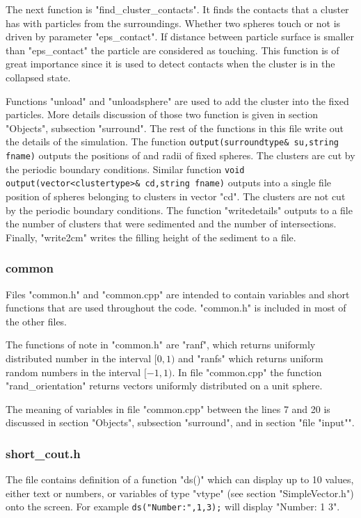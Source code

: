 \documentclass[12pt]{article}
\begin{document}
The next function is "find\_cluster\_contacts". It finds the contacts that a cluster has with particles from the surroundings. Whether two spheres touch or not is driven by parameter "eps\_contact". If distance between particle surface is smaller than "eps\_contact" the particle are considered as touching. This function is of great importance since it is used to detect contacts when the cluster is in the collapsed state. 

Functions "unload" and "unloadsphere" are used to add the cluster into the fixed particles. More details discussion of those two function is given in section "Objects", subsection "surround". The rest of the functions in this file write out the details of the simulation. The function \texttt{output(surroundtype\& su,string fname)} outputs the positions of and radii of fixed spheres. The clusters are cut by the periodic boundary conditions. Similar function \texttt{void output(vector<clustertype>\& cd,string fname)} outputs into a single file position of spheres belonging to clusters in vector "cd". The clusters are not cut by the periodic boundary conditions. The function "writedetails" outputs to a file the number of clusters that were sedimented and the number of intersections. Finally, "write2cm" writes the filling height of the sediment to a file. 
\subsubsection{common}
Files "common.h" and "common.cpp" are intended to contain variables and short functions that are used throughout the code. "common.h" is included in most of the other files. 

The functions of note in "common.h" are "ranf", which returns uniformly distributed number in the interval $[0,1)$ and "ranfs" which returns uniform random numbers in the interval $[-1,1)$. In file "common.cpp" the function "rand\_orientation" returns vectors uniformly distributed on a unit sphere.

The meaning of variables in file "common.cpp" between the lines 7 and 20 is discussed in section "Objects", subsection "surround", and in section "file "input"". 

\subsubsection{short\_cout.h}
The file contains definition of a function "ds()" which can display up to 10 values, either text or numbers, or variables of type "vtype" (see section "SimpleVector.h") onto the screen. For example \texttt{ds("Number:",1,3);} will display "Number: 1 3".
\end{document}
